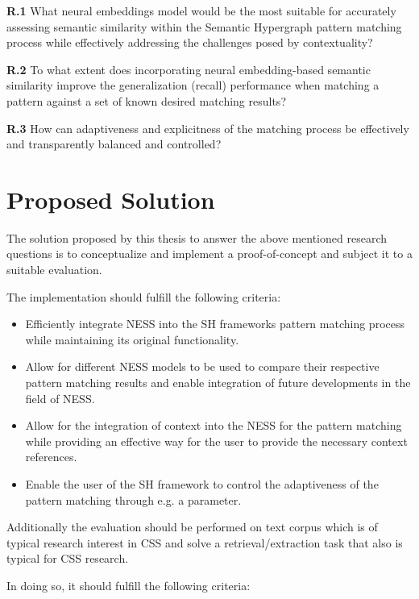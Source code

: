 \documentclass[11pt]{scrreprt}
\begin{document}
\textbf{R.1} What neural embeddings model would be the most suitable for accurately assessing semantic similarity within the Semantic Hypergraph pattern matching process while effectively addressing the challenges posed by contextuality?

\textbf{R.2} To what extent does incorporating neural embedding-based semantic similarity improve the generalization (recall) performance when matching a pattern against a set of known desired matching results?

\textbf{R.3} How can adaptiveness and explicitness of the matching process be effectively and transparently balanced and controlled?


\section{Proposed Solution}

The solution proposed by this thesis to answer the above mentioned research questions is to conceptualize and implement a proof-of-concept and subject it to a suitable evaluation. 

The implementation should fulfill the following criteria:

\begin{itemize}
	\item Efficiently integrate NESS into the SH frameworks pattern matching process while maintaining its original functionality.
	\item Allow for different NESS models to be used to compare their respective pattern matching results and enable integration of future developments in the field of NESS.
	\item Allow for the integration of context into the NESS for the pattern matching while providing an effective way for the user to provide the necessary context references.
	\item Enable the user of the SH framework to control the adaptiveness of the pattern matching through e.g. a parameter.
\end{itemize}

Additionally the evaluation should be performed on text corpus which is of typical research interest in CSS and solve a retrieval/extraction task that also is typical for CSS research. 

In doing so, it should fulfill the following criteria:
\end{document}
